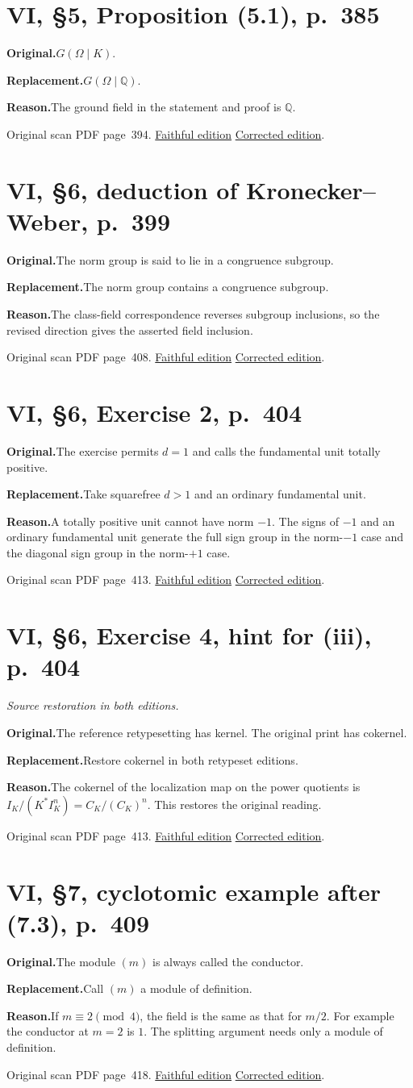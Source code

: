 \documentclass[11pt,a4paper]{article}
\newcommand{\original}{\par\smallskip\noindent\textbf{Original.}\enspace}
\newcommand{\replacement}{\par\smallskip\noindent\textbf{Replacement.}\enspace}
\newcommand{\reason}{\par\smallskip\noindent\textbf{Reason.}\enspace}
\newcommand{\editionlink}[3]{\href{#1\#errata.#2}{#3}}
\newcommand{\location}[2]{%
  \par\smallskip\noindent Original scan PDF page~#2.\enspace
  \editionlink{Neukirch_Faithful.pdf}{#1}{Faithful edition}
  \quad\editionlink{Neukirch_Corrected.pdf}{#1}{Corrected edition}.}
\begin{document}
\setcounter{section}{29}
\section{VI, \S5, Proposition (5.1), p.~385}\label{errata:item:30}
\original $G(\Omega\mid K)$.
\replacement $G(\Omega\mid\mathbb Q)$.
\reason The ground field in the statement and proof is $\mathbb Q$.
\location{30}{394}

\setcounter{section}{30}
\section{VI, \S6, deduction of Kronecker--Weber, p.~399}\label{errata:item:31}
\original The norm group is said to lie in a congruence subgroup.
\replacement The norm group contains a congruence subgroup.
\reason The class-field correspondence reverses subgroup inclusions, so the revised direction gives the asserted field inclusion.
\location{31}{408}

\setcounter{section}{31}
\section{VI, \S6, Exercise 2, p.~404}\label{errata:item:32}
\original The exercise permits $d=1$ and calls the fundamental unit totally positive.
\replacement Take squarefree $d>1$ and an ordinary fundamental unit.
\reason A totally positive unit cannot have norm $-1$. The signs of $-1$ and an ordinary fundamental unit generate the full sign group in the norm-$-1$ case and the diagonal sign group in the norm-$+1$ case.
\location{32}{413}

\setcounter{section}{32}
\section{VI, \S6, Exercise 4, hint for (iii), p.~404}\label{errata:item:33}
\noindent\emph{Source restoration in both editions.}\par
\original The reference retypesetting has kernel. The original print has cokernel.
\replacement Restore cokernel in both retypeset editions.
\reason The cokernel of the localization map on the power quotients is $I_K/(K^*I_K^n)=C_K/(C_K)^n$. This restores the original reading.
\location{33}{413}

\setcounter{section}{33}
\section{VI, \S7, cyclotomic example after (7.3), p.~409}\label{errata:item:34}
\original The module $(m)$ is always called the conductor.
\replacement Call $(m)$ a module of definition.
\reason If $m\equiv2\pmod4$, the field is the same as that for $m/2$. For example the conductor at $m=2$ is $1$. The splitting argument needs only a module of definition.
\location{34}{418}
\end{document}
